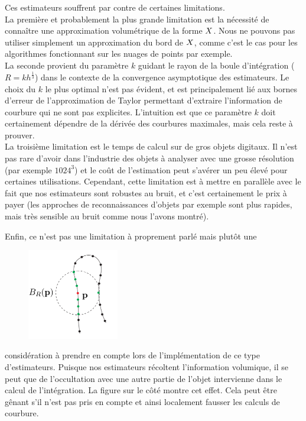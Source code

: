 Ces estimateurs souffrent par contre de certaines limitations.\\
%
La première et probablement la plus grande limitation est la nécessité de
connaître une approximation volumétrique de la forme $X$. Nous ne pouvons
pas utiliser simplement un approximation du bord de $X$, comme c'est le cas
pour les algorithmes fonctionnant sur les nuages de points par exemple.\\
%
La seconde provient du paramètre $k$ guidant le rayon de la boule d'intégration
($R=kh^\frac{1}{3}$) dans le contexte de la convergence asymptotique des
estimateurs. Le choix du $k$ le plus optimal n'est pas évident, et est
principalement lié aux bornes d'erreur de l'approximation de Taylor permettant
d'extraire l'information de courbure qui ne sont pas explicites. L'intuition est
que ce paramètre $k$ doit certainement dépendre de la dérivée des courbures
maximales, mais cela reste à prouver.\\
%
La troisième limitation est le temps de calcul sur de gros objets digitaux. Il
n'est pas rare d'avoir dans l'industrie des objets à analyser avec une grosse
résolution (par exemple $1024^3$) et le coût de l'estimation peut s'avérer un
peu élevé pour certaines utilisations. Cependant, cette limitation est à mettre
en parallèle avec le fait que nos estimateurs sont robustes au bruit, et c'est
certainement le prix à payer (les approches de reconnaissances d'objets par
exemple sont plus rapides, mais très sensible au bruit comme nous l'avons
montré).


Enfin, ce n'est pas une limitation à proprement parlé mais plutôt une
%
\begin{figure}
	\includegraphics[width=4cm]{images/CriticalRadius}
\end{figure}
%
considération à prendre en compte lors de l'implémentation de ce type
d'estimateurs. Puisque nos estimateurs récoltent l'information volumique, il se
peut que de l'occultation avec une autre partie de l'objet intervienne dans le
calcul de l’intégration. La figure sur le côté montre cet effet. Cela peut être
gênant s'il n'est pas pris en compte et ainsi localement fausser les calculs de
courbure.


